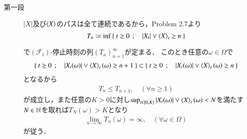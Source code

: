 	\begin{prf}\mbox{}
		\begin{description}
			\item[第一段]
				$|X|$及び$\inprod<X>$のパスは全て連続であるから，Problem 2.7より
				\begin{align}
					T_n \coloneqq \inf{}{\Set{t \geq 0}{|X_t| \vee \inprod<X>_t \geq n}}
				\end{align}
				で$(\mathscr{F}_t)$-停止時刻の列$(T_n)_{n=1}^\infty$が定まる．
				このとき任意の$\omega \in \Omega$で
				\begin{align}
					\Set{t \geq 0}{|X_t(\omega)| \vee \inprod<X>_t(\omega) \geq n+1}
					\subset \Set{t \geq 0}{|X_t(\omega)| \vee \inprod<X>_t(\omega) \geq n}
				\end{align}
				となるから
				\begin{align}
					T_n \leq T_{n+1}, \quad (\forall n \geq 1)
				\end{align}
				が成立し，また任意の$K > 0$に対し$\sup{t \in [0,K]}{|X_t(\omega)| \vee \inprod<X>_t(\omega)} < N$を満たす
				$N \in \mathbb{N}$を取れば$T_N(\omega) > K$となり
				\begin{align}
					\lim_{n \to \infty} T_n(\omega) = \infty, \quad (\forall \omega \in \Omega)
					\label{eq:chapter_1_theorem_5_8_1}
				\end{align}
				が従う．
				

\end{description}
\end{prf}
